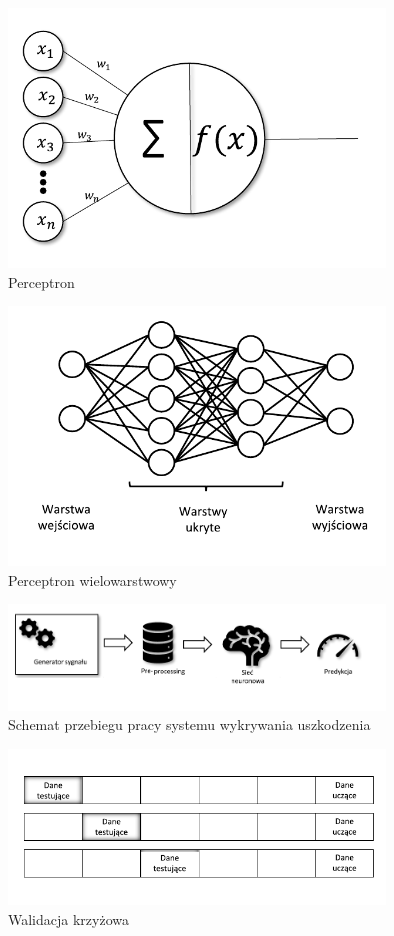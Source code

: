 \documentclass[12pt, a4paper, oneside]{article}
\begin{document}
	\begin{figure}[H]
		\centering
		\includegraphics[width=10cm]{images/perceptron_c.pdf}
		\caption{Perceptron}
	\end{figure}
	\begin{figure}[H]
		\centering
		\includegraphics[width=10cm]{images/siec_c.pdf}
		\caption{Perceptron wielowarstwowy}
	\end{figure}
	\begin{figure}[H]
		\centering
		\includegraphics[width=10cm]{images/workflow_c.pdf}
		\caption{Schemat przebiegu pracy systemu wykrywania uszkodzenia}
	\end{figure}
	\begin{figure}[H]
		\centering
		\includegraphics[width=10cm]{images/walidacja_c.pdf}
		\caption{Walidacja krzyżowa}
	\end{figure}
	
\end{document}
